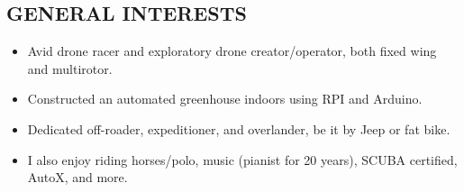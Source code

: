 \documentclass[10pt]{res} %
\begin{document}
\begin{resume}
\section{GENERAL INTERESTS}
\begin{itemize} \itemsep -2pt
\item Avid drone racer and exploratory drone creator/operator, both fixed wing and multirotor. 
\item Constructed an automated greenhouse indoors using RPI and Arduino.
\item Dedicated off-roader, expeditioner, and overlander, be it by Jeep or fat bike.
\item I also enjoy riding horses/polo, music (pianist for 20 years), SCUBA certified, AutoX, and more.
\end{itemize}


\end{resume} 
\end{document}
